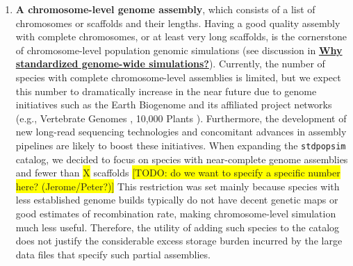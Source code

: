\documentclass[hidelinks]{article}
\newcommand{\stdpopsim}{\texttt{stdpopsim}\xspace}
\begin{document}
\begin{enumerate}
\def\labelenumi{\arabic{enumi}.}
\item
  \textbf{A chromosome-level genome assembly}, which consists of a list of chromosomes or scaffolds and their lengths. 
  Having a good quality assembly with complete chromosomes, or at least very long scaffolds, 
  is the cornerstone of chromosome-level population genomic simulations 
  (see discussion in \hyperref[sec:std-sim]{\textbf{Why standardized genome-wide simulations?}}). 
  Currently, the number of species with complete chromosome-level assemblies is limited,
  but we expect this number to dramatically increase in the near future due to genome initiatives 
  such as the Earth Biogenome \citep{Lewin2022} and its affiliated project networks (e.g.,
  Vertebrate Genomes \citep{Rhie2021}, 10,000 Plants \citep{Cheng2018}).
  Furthermore, the development of new long-read sequencing technologies
  \citep{Amarasinghe2020} and concomitant advances in assembly pipelines
  \citep{Chakraborty2016} are likely to boost these initiatives. 
  When expanding the \stdpopsim catalog, we decided to focus on species with near-complete 
  genome assemblies and fewer than \colorbox{yellow}{X} scaffolds %
  \colorbox{yellow}{[TODO: do we want to specify a specific number here? (Jerome/Peter?)]} 
  This restriction was set mainly because species with less established genome builds 
  typically do not have decent genetic maps or good estimates of recombination rate, 
  making chromosome-level simulation much less useful. 
  Therefore, the utility of adding such species to the catalog does not justify the 
  considerable excess storage burden incurred by the large data files that specify such partial assemblies.


\end{enumerate}
\end{document}
